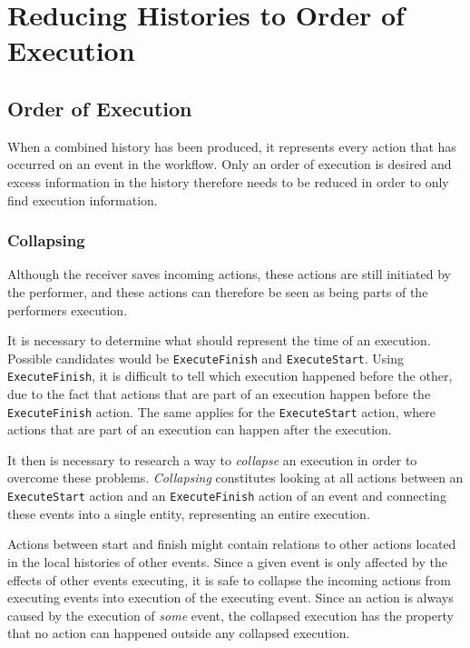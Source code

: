 \chapter{Reducing Histories to Order of Execution}
\label{chap:order-of-execution}
\section{Order of Execution}
	When a combined history has been produced, it represents every action that has occurred on an event in the workflow. 
	Only an order of execution is desired and excess information in the history therefore needs to be reduced in order to only find execution information. 
	
	\subsection{Collapsing}
	Although the receiver saves incoming actions, these actions are still initiated by the performer, and these actions can therefore be seen as being parts of the performers execution. 
		
	It is necessary to determine what should represent the time of an execution. Possible candidates would be \texttt{ExecuteFinish} and \texttt{ExecuteStart}. Using \texttt{ExecuteFinish}, it is difficult to tell which execution happened before the other, due to the fact that actions that are part of an execution happen before the \texttt{ExecuteFinish} action. 
	The same applies for the \texttt{ExecuteStart} action, where actions that are part of an execution can happen after the execution.
	
	\newpar It then is necessary to research a way to \textit{collapse} an execution in order to overcome these problems. \textit{Collapsing} constitutes looking at all actions between an \texttt{ExecuteStart} action and an \texttt{ExecuteFinish} action of an event and connecting these events into a single entity, representing an entire execution. 
	
	Actions between start and finish might contain relations to other actions located in the local histories of other events. Since a given event is only affected by the effects of other events executing, it is safe to collapse the incoming actions from executing events into execution of the executing event. Since an action is always caused by the execution of \textit{some} event, the collapsed execution has the property that no action can happened outside any collapsed execution.
	
